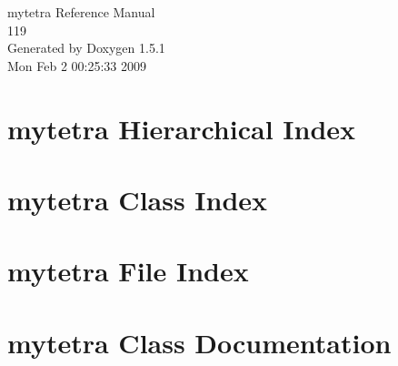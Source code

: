 \documentclass[a4paper]{book}
\begin{document}
\begin{titlepage}
\vspace*{7cm}
\begin{center}
{\Large mytetra Reference Manual\\[1ex]\large 119 }\\
\vspace*{1cm}
{\large Generated by Doxygen 1.5.1}\\
\vspace*{0.5cm}
{\small Mon Feb 2 00:25:33 2009}\\
\end{center}
\end{titlepage}
\clearemptydoublepage
{}
\tableofcontents
\clearemptydoublepage
{}
\chapter{mytetra Hierarchical Index}

\chapter{mytetra Class Index}

\chapter{mytetra File Index}

\chapter{mytetra Class Documentation}






















\end{document}
